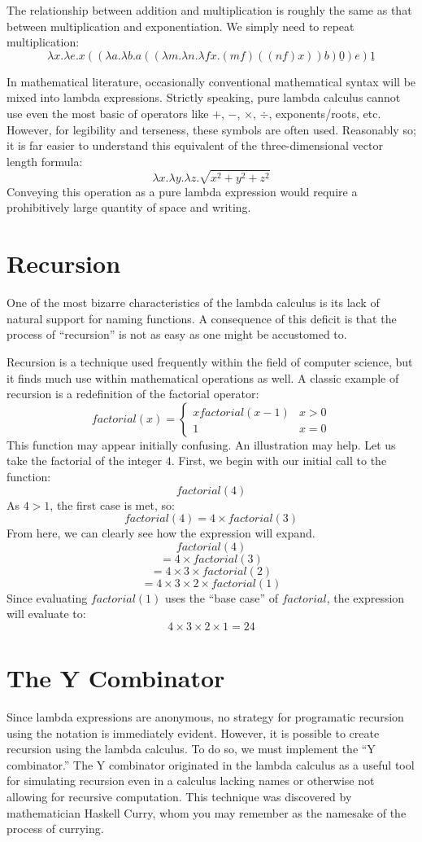 \documentclass[twocolumn,titlepage,12pt]{article}
\begin{document}
The relationship between addition and multiplication is roughly the same as that between multiplication and exponentiation. We simply need to repeat multiplication:
$$\lambda x.\lambda e.x ((\lambda a.\lambda b.a ((\lambda m.\lambda n.\lambda fx.(m f) ((n f) x)) b) \underline{0}) e) \underline{1}$$


In mathematical literature, occasionally conventional mathematical syntax will be mixed into lambda expressions. Strictly speaking, pure lambda calculus cannot use even the most basic of operators like $+$, $-$, $\times$, $\div$, exponents/roots, etc. However, for legibility and terseness, these symbols are often used. Reasonably so; it is far easier to understand this equivalent of the three-dimensional vector length formula:
$$\lambda x.\lambda y.\lambda z.\sqrt{x^2+y^2+z^2}$$
Conveying this operation as a pure lambda expression would require a prohibitively large quantity of space and writing.

\section{Recursion}
One of the most bizarre characteristics of the lambda calculus is its lack of natural support for naming functions. A consequence of this deficit is that the process of ``recursion'' is not as easy as one might be accustomed to.

Recursion is a technique used frequently within the field of computer science, but it finds much use within mathematical operations as well. A classic example of recursion is a redefinition of the factorial operator:
\[
factorial(x)=
\begin{cases}
    x factorial(x-1) & x>0 \\
    1 & x=0
\end{cases}
\]
This function may appear initially confusing. An illustration may help. Let us take the factorial of the integer $4$. First, we begin with our initial call to the function:
$$factorial(4)$$
As $4>1$, the first case is met, so:
$$factorial(4)=4\times factorial(3)$$
From here, we can clearly see how the expression will expand.
$$factorial(4)$$
$$=4\times factorial(3)$$
$$=4\times 3\times factorial(2)$$
$$=4\times 3\times 2\times factorial(1)$$
Since evaluating $factorial(1)$ uses the ``base case'' of $factorial$, the expression will evaluate to:
$$4\times 3\times 2\times 1=24$$

\section{The Y Combinator}
Since lambda expressions are anonymous, no strategy for programatic recursion using the notation is immediately evident. However, it is possible to create recursion using the lambda calculus. To do so, we must implement the ``Y combinator.''\cite{ycombmedium} The Y combinator originated in the lambda calculus as a useful tool for simulating recursion even in a calculus lacking names or otherwise not allowing for recursive computation. This technique was discovered by mathematician Haskell Curry, whom you may remember as the namesake of the process of currying.
\end{document}

